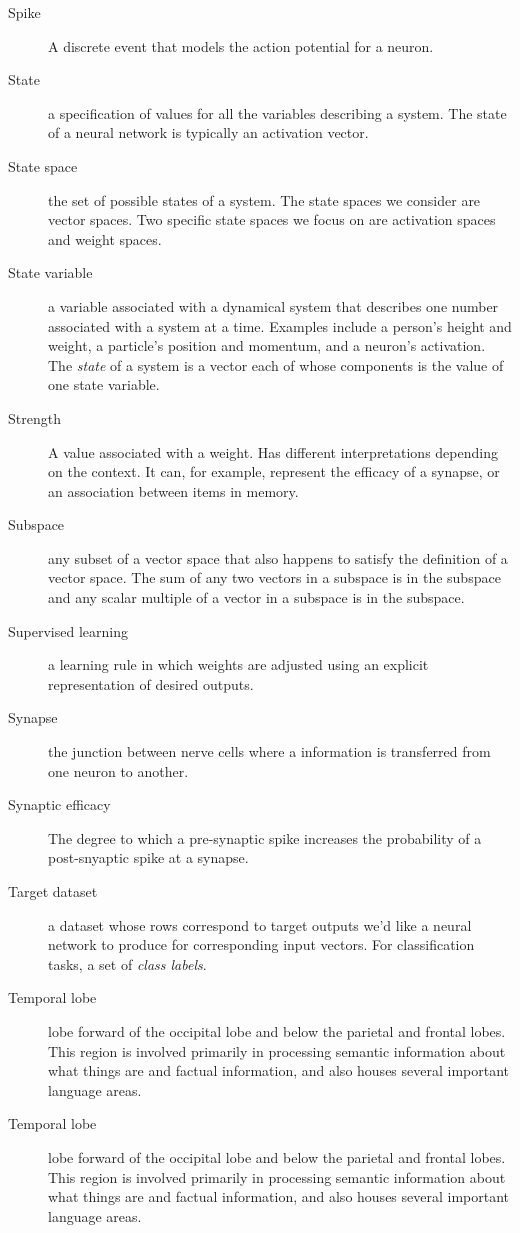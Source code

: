 \begin{description}
\item[Spike] A discrete event that models the action potential for a neuron.
\item[State] a specification of values for all the variables describing a system. The state of a neural network is typically an activation vector.
\item[State space] the set of possible states of a system. The state spaces we consider are vector spaces. Two specific state spaces we focus on are activation spaces and weight spaces.
\item[State variable] a variable associated with a dynamical system that describes one number associated with a system at a time. Examples include a person's height and weight, a particle's position and momentum, and a neuron's activation. The \emph{state} of a system is a vector each of whose components is the value of one state variable. 
\item[Strength] A value associated with a weight. Has different interpretations depending on the context. It can, for example, represent the efficacy of a synapse, or an association between items in memory.
\item[Subspace] any subset of a vector space that also happens to satisfy the definition of a vector space. The sum of any two vectors in a subspace is in the subspace and any scalar multiple of a vector in a subspace is in the subspace.
\item[Supervised learning] a learning rule in which weights are adjusted using an explicit representation of desired outputs.
\item[Synapse] the junction between nerve cells where a information is transferred from one neuron to another.
\item[Synaptic efficacy] The degree to which a pre-synaptic spike increases the probability of a post-snyaptic spike at a synapse.
\item[Target dataset] a dataset whose rows correspond to target outputs we'd like a neural network to produce for corresponding input vectors. For classification tasks, a set of \emph{class labels}.
\item[Temporal lobe] lobe forward of the occipital lobe and below the parietal and frontal lobes. This region is involved primarily in processing semantic information about what things are and factual information, and also houses several important language areas.
\item[Temporal lobe] lobe forward of the occipital lobe and below the parietal and frontal lobes. This region is involved primarily in processing semantic information about what things are and factual information, and also houses several important language areas.

\end{description}
